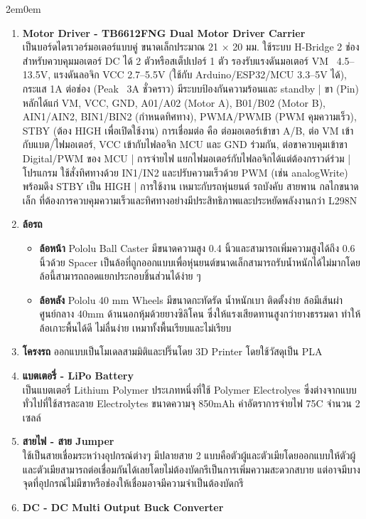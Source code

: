 \documentclass[14pt, fleqn, a4paper]{extarticle}
\begin{document}
\begin{adjustwidth}{2em}{0em}
\begin{enumerate}
		\item \textbf{Motor Driver - TB6612FNG Dual Motor Driver Carrier} \\
			เป็นบอร์ดไดรเวอร์มอเตอร์แบบคู่ ขนาดเล็กประมาณ 21 × 20 มม. ใช้ระบบ H-Bridge 2 ช่อง สำหรับควบคุมมอเตอร์ DC ได้ 2 ตัวหรือสเต็ปเปอร์ 1 ตัว รองรับแรงดันมอเตอร์ VM ~4.5–13.5V, แรงดันลอจิก VCC 2.7–5.5V (ใช้กับ Arduino/ESP32/MCU 3.3–5V ได้), กระแส 1A ต่อช่อง (Peak ~3A ชั่วคราว) มีระบบป้องกันความร้อนและ standby | ขา (Pin) หลักได้แก่ VM, VCC, GND, A01/A02 (Motor A), B01/B02 (Motor B), AIN1/AIN2, BIN1/BIN2 (กำหนดทิศทาง), PWMA/PWMB (PWM คุมความเร็ว), STBY (ต้อง HIGH เพื่อเปิดใช้งาน) การเชื่อมต่อ คือ ต่อมอเตอร์เข้าขา A/B, ต่อ VM เข้ากับแบต/ไฟมอเตอร์, VCC เข้ากับไฟลอจิก MCU และ GND ร่วมกัน, ต่อขาควบคุมเข้าขา Digital/PWM ของ MCU | การจ่ายไฟ แยกไฟมอเตอร์กับไฟลอจิกได้แต่ต้องกราวด์ร่วม | โปรแกรม ใช้สั่งทิศทางด้วย IN1/IN2 และปรับความเร็วด้วย PWM (เช่น analogWrite) พร้อมดึง STBY เป็น HIGH | การใช้งาน เหมาะกับรถหุ่นยนต์ รถบังคับ สายพาน กลไกขนาดเล็ก ที่ต้องการควบคุมความเร็วและทิศทางอย่างมีประสิทธิภาพและประหยัดพลังงานกว่า L298N
		\item \textbf{ล้อรถ}
			\begin{itemize}
				\item \textbf{ล้อหน้า} Pololu Ball Caster มีขนาดความสูง 0.4 นิ้วและสามารถเพิ่มความสูงได้ถึง 0.6 นิ้วด้วย Spacer เป็นล้อที่ถูกออกแบบเพื่อหุ่นยนต์ขนาดเล็กสามารถรับน้ำหนักได้ไม่มากโดยล้อนี้สามารถถอดแยกประกอบชิ้นส่วนได้ง่าย ๆ
				\item \textbf{ล้อหลัง} Pololu 40 mm Wheels มีขนาดกะทัดรัด น้ำหนักเบา ติดตั้งง่าย ล้อมีเส้นผ่าศูนย์กลาง 40mm ด้านนอกหุ้มด้วยยางซิลิโคน ซึ่งให้แรงเสียดทานสูงกว่ายางธรรมดา ทำให้ล้อเกาะพื้นได้ดี ไม่ลื่นง่าย เหมาทั้งพื้นเรียบและไม่เรียบ
			\end{itemize}
		\item \textbf{โครงรถ}
			ออกแบบเป็นโมเดลสามมิติและปริ๊นโดย 3D Printer โดยใช้วัสดุเป็น PLA
		\item \textbf{แบตเตอรี่ - LiPo Battery} \\
			เป็นแบตเตอรี่ Lithium Polymer ประเภทหนึ่งที่ใช้ Polymer Electrolyes ซึ่งต่างจากแบบทั่วไปที่ใช้สารละลาย Electrolytes ขนาดความจุ 850mAh ค่าอัตราการจ่ายไฟ 75C จำนวน 2 เซลล์
		\item \textbf{สายไฟ - สาย Jumper} \\
			ใช้เป็นสายเชื่อมระหว่างอุปกรณ์ต่างๆ มีปลายสาย 2 แบบคือตัวผู้และตัวเมียโดยออกแบบให้ตัวผู้และตัวเมียสามารถต่อเชื่อมกันได้เลยโดยไม่ต้องบัดกรีเป็นการเพิ่มความสะดวกสบาย แต่อาจมีบางจุดที่อุปกรณ์ไม่มีขาหรือช่องให้เชื่อมอาจมีความจำเป็นต้องบัดกรี
		\item \textbf{DC - DC Multi Output Buck Converter} \\

\end{enumerate}
\end{adjustwidth}
\end{document}
